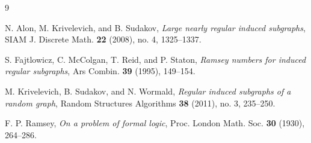 \documentclass[11pt]{article}
\theoremstyle{remark}
\begin{document}
\begin{thebibliography}{9}

N. Alon, M. Krivelevich, and B. Sudakov,
\emph{Large nearly regular induced subgraphs},
SIAM J. Discrete Math. \textbf{22} (2008), no. 4, 1325--1337.

S. Fajtlowicz, C. McColgan, T. Reid, and P. Staton,
\emph{Ramsey numbers for induced regular subgraphs},
Ars Combin. \textbf{39} (1995), 149--154.

M. Krivelevich, B. Sudakov, and N. Wormald,
\emph{Regular induced subgraphs of a random graph},
Random Structures Algorithms \textbf{38} (2011), no. 3, 235--250.

F. P. Ramsey,
\emph{On a problem of formal logic},
Proc. London Math. Soc. \textbf{30} (1930), 264--286.

\end{thebibliography}
\end{document}
